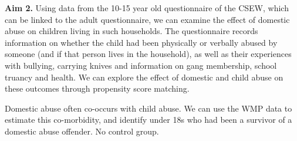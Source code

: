 \documentclass[11pt, a4paper]{article}
\begin{document}
\textbf{Aim 2.} Using data from the 10-15 year old questionnaire of the CSEW, which can be linked to the adult questionnaire, we can examine the effect of domestic abuse on children living in such households. The questionnaire records information on whether the child had been physically or verbally abused by someone (and if that person lives in the household), as well as their experiences with bullying, carrying knives and information on gang membership, school truancy and health. We can explore the effect of domestic and child abuse on these outcomes through propensity score matching.

Domestic abuse often co-occurs with child abuse. We can use the WMP data to estimate this co-morbidity, and identify under 18s who had been a survivor of a domestic abuse offender. No control group. 








\end{document}
